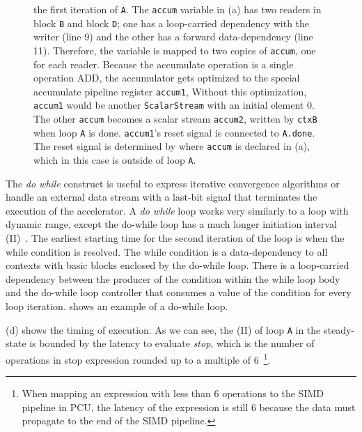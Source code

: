 \begin{figure}
{the first iteration of \texttt{A}.
The \texttt{accum} variable in (a) has two readers in block \texttt{B} and block \texttt{D}; one has a
loop-carried dependency with the writer (line 9) and the other has a forward data-dependency (line
11). 
Therefore, the variable is mapped to two copies of \texttt{accum}, one for each reader. 
Because the accumulate operation is a single operation ADD, the accumulator gets optimized to the special
accumulate pipeline register \texttt{accum1}, 
Without this optimization, \texttt{accum1} would be another \texttt{ScalarStream} with an initial
element 0.
The other \texttt{accum} becomes a scalar stream \texttt{accum2}, written by \texttt{ctxB} when loop \texttt{A}
is done.
  \texttt{accum1}'s reset signal is connected to \texttt{A.done}. The reset signal is determined by where
  \texttt{accum} is declared in (a), which in this case is outside of loop \texttt{A}.
}
\label{fig:dowhile} 
\end{figure}

The \emph{do while} construct is useful to express iterative convergence algorithms or handle an external
data stream with a last-bit signal that terminates the execution of the accelerator.
A \emph{do while} loop works very similarly to a loop with dynamic range, except the do-while loop has a much
longer initiation interval (II)~\cite{II}. 
The earliest starting time for the second iteration of the loop is when the while condition is resolved.
The while condition is a data-dependency to all contexts with basic blocks enclosed by the do-while loop.
There is a loop-carried dependency between the producer of the condition within the while loop body
and the do-while loop controller that consumes a value of the condition for every loop iteration.
 shows an example of a do-while loop.

(d) shows the timing of execution. As we can see, the (II) of loop \texttt{A}
in the steady-state is bounded by the latency to evaluate \emph{stop}, which is the number of
operations in stop expression rounded up to a multiple of 6~\footnote{When mapping an expression
with less than 6 operations to the SIMD pipeline in PCU, the latency of the expression is still 6 
because the data must propagate to the end of the SIMD pipeline.}.

